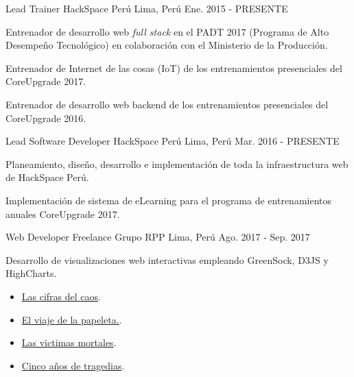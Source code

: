 \begin{cventries}
  \cventry
    {Lead Trainer} %
    {HackSpace Perú} %
    {Lima, Perú} %
    {Ene. 2015 - PRESENTE} %
    {
      \begin{cvitems} %
        \item {Entrenador de desarrollo web \textit{full stack} en el PADT 2017
        (Programa de Alto Desempeño Tecnológico) en colaboración con el
        Ministerio de la Producción.}
        \item {Entrenador de Internet de las cosas (IoT) de los entrenamientos
        presenciales del CoreUpgrade 2017.}
        \item {Entrenador de desarrollo web backend de los entrenamientos
        presenciales del CoreUpgrade 2016.}
      \end{cvitems}
    }

  \cventry
    {Lead Software Developer} %
    {HackSpace Perú} %
    {Lima, Perú} %
    {Mar. 2016 - PRESENTE} %
    {
      \begin{cvitems} %
        \item {Planeamiento, diseño,  desarrollo e implementación de toda la
        infraestructura web de HackSpace Perú.}
        \item {Implementación de sistema de eLearning para el programa de
        entrenamientos anuales CoreUpgrade 2017.}
      \end{cvitems}
    }

  \cventry
    {Web Developer Freelance} %
    {Grupo RPP} %
    {Lima, Perú} %
    {Ago. 2017 - Sep. 2017} %
    {
      \begin{cvitems} %
        \item {Desarrollo de visualizaciones web interactivas empleando
        GreenSock, D3JS y HighCharts.}
        \begin{itemize}
          \item {\href{https://goo.gl/oCo4gW}{Las cifras del caos}.}
          \item {\href{https://goo.gl/xPWHUZ}{El viaje de la papeleta.}.}
          \item {\href{https://goo.gl/KPA5DA}{Las victimas mortales}.}
          \item {\href{https://goo.gl/jwA8Kh}{Cinco años de tragedias}.}
        \end{itemize}
      \end{cvitems}
    }


\end{cventries}
